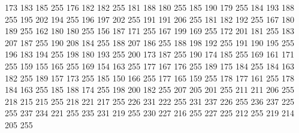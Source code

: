 173 183 185 255 176 182 182 255 181 188 180 255 185 190 179 255 184 193 188 255 195 202 194 255 196 197 202 255 191 191 206 255 181 182 192 255 167 180 189 255 162 180 180 255 156 187 171 255 167 199 169 255 172 201 181 255 183 207 187 255 190 208 184 255
188 207 186 255 188 198 192 255 191 190 195 255 196 183 194 255 198 180 193 255 200 173 187 255 190 174 185 255 169 161 171 255 159 155 165 255 169 154 163 255 177 167 176 255 189 175 184 255 184 163 182 255 189 157 173 255 185 150 166 255 177 165 159 255
178 177 161 255 178 184 163 255 185 188 174 255 198 200 182 255 207 205 201 255 211 211 206 255 218 215 215 255 218 221 217 255 226 231 222 255 231 237 226 255 236 237 225 255 237 234 221 255 235 231 219 255 230 227 216 255 227 225 212 255 219 214 205 255